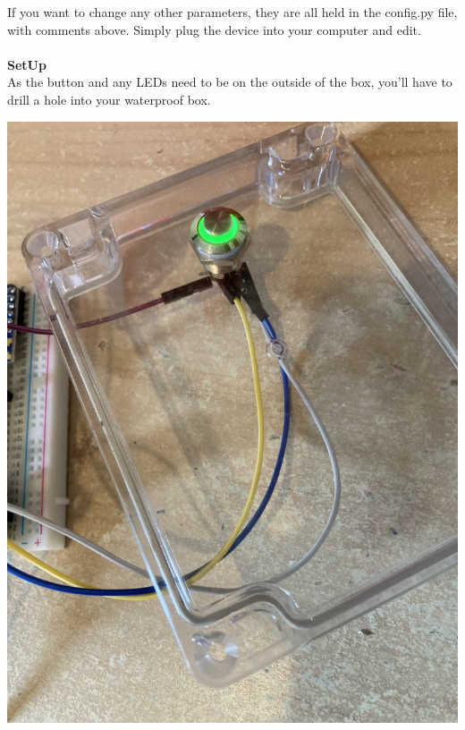 \documentclass[12pt,a4paper]{report}
\begin{document}
If you want to change any other parameters, they are all held in the config.py file, with comments above. Simply plug the device into your computer and edit. \\ \\

\textbf{SetUp} \\
As the button and any LEDs need to be on the outside of the box, you'll have to drill a hole into your waterproof box.  
\begin{center}
\includegraphics[scale = 0.1]{button.jpeg}
\end{center}
\end{document}

